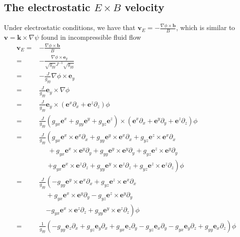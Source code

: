 \documentclass[12pt]{article}
\def\L{\left}
\def\R{\right}
\newcommand{\ve}[1]{\ensuremath{\boldsymbol{#1}}}
\begin{document}
\subsection{The electrostatic \texorpdfstring{$E\times B$}{ExB} velocity}
%
Under electrostatic conditions, we have that $\ve{v}_E = 
-\frac{\nabla\phi\times\ve{b}}{B}$, which is similar to 
$\ve{v}=\ve{k}\times\nabla\psi$ found in incompressible fluid flow
%
\begin{align*}
    \ve{v}_E =& -\frac{\nabla\phi\times\ve{b}}{B}\\
	     =&-\frac{\nabla\phi\times\ve{e}_y}{
               \sqrt{g_{yy}}J^{-1}\sqrt{g_{yy}}}\\
	     =&-\frac{J}{g_{yy}}\nabla\phi\times\ve{e}_y\\
	     =&\frac{J}{g_{yy}}\ve{e}_y\times\nabla\phi\\
	     =&\frac{J}{g_{yy}}\ve{e}_y\times
	       \L(\ve{e}^x\partial_x + \ve{e}^z\partial_z\R)\phi\\
	     =&\frac{J}{g_{yy}}
	       \L(g_{yx}\ve{e}^x + g_{yy}\ve{e}^y + g_{yz}\ve{e}^z\R)
	       \times
	       \L(\ve{e}^x\partial_x +
	          \ve{e}^y\partial_y + 
                  \ve{e}^z\partial_z\R)\phi\\
	     =&\frac{J}{g_{yy}}
	       \L(
	         g_{yx}\ve{e}^x\times\ve{e}^x\partial_x
	       + g_{yy}\ve{e}^y\times\ve{e}^x\partial_x
	       + g_{yz}\ve{e}^z\times\ve{e}^x\partial_x
	       \R.
	       \\
	       &\quad\;
	       + g_{yx}\ve{e}^x\times\ve{e}^y\partial_y
	       + g_{yy}\ve{e}^y\times\ve{e}^y\partial_y
	       + g_{yz}\ve{e}^z\times\ve{e}^y\partial_y
	       \\
	       &\quad\;
	       \L.
	       + g_{yx}\ve{e}^x\times\ve{e}^z\partial_z
	       + g_{yy}\ve{e}^y\times\ve{e}^z\partial_z
	       + g_{yz}\ve{e}^z\times\ve{e}^z\partial_z
	       \R)
	       \phi\\
	     =&\frac{J}{g_{yy}}
	       \L(
	       - g_{yy}\ve{e}^y\times\ve{e}^x\partial_x
	       + g_{yz}\ve{e}^z\times\ve{e}^x\partial_x
	       \R.
	       \\
	       &\quad
	       + g_{yx}\ve{e}^x\times\ve{e}^y\partial_y
	       - g_{yz}\ve{e}^z\times\ve{e}^y\partial_y
	       \\
	       &\quad
	       \L.
	       - g_{yx}\ve{e}^x\times\ve{e}^z\partial_z
	       + g_{yy}\ve{e}^y\times\ve{e}^z\partial_z
	       \R)
	       \phi\\
	     =&\frac{1}{g_{yy}}
	       \L(
	       - g_{yy}\ve{e}_z\partial_x
	       + g_{yz}\ve{e}_y\partial_x
	       + g_{yx}\ve{e}_z\partial_y
	       - g_{yz}\ve{e}_x\partial_y
	       - g_{yx}\ve{e}_y\partial_z
	       + g_{yy}\ve{e}_x\partial_z
	       \R)
	       \phi
\end{align*}
\end{document}
